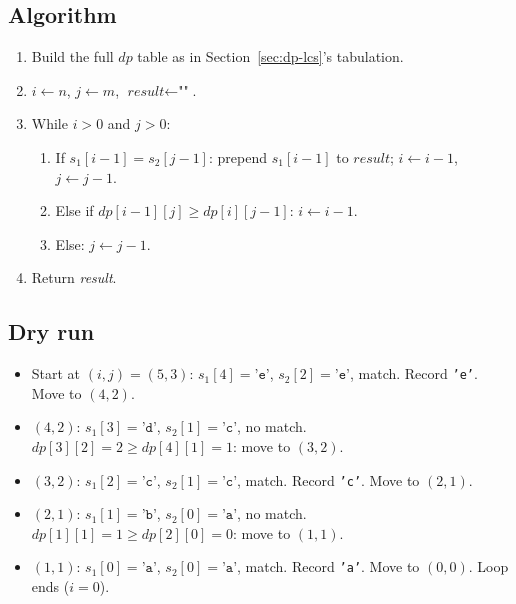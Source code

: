 \subsection*{Algorithm}

\begin{enumerate}
  \item Build the full $\textit{dp}$ table as in
        Section~\ref{sec:dp-lcs}'s tabulation.
  \item $i \gets n$, $j \gets m$, $\textit{result} \gets \texttt{""}$.
  \item While $i>0$ and $j>0$:
  \begin{enumerate}
    \item If $s_1[i-1] = s_2[j-1]$: prepend $s_1[i-1]$ to
          $\textit{result}$; $i \gets i-1$, $j \gets j-1$.
    \item Else if $\textit{dp}[i-1][j] \ge \textit{dp}[i][j-1]$:
          $i \gets i-1$.
    \item Else: $j \gets j-1$.
  \end{enumerate}
  \item Return \textit{result}.
\end{enumerate}

\subsection*{Dry run}


\begin{itemize}
  \item Start at $(i,j)=(5,3)$: $s_1[4]=\texttt{'e'}$,
        $s_2[2]=\texttt{'e'}$, match. Record \texttt{'e'}. Move to
        $(4,2)$.
  \item $(4,2)$: $s_1[3]=\texttt{'d'}$, $s_2[1]=\texttt{'c'}$, no
        match. $\textit{dp}[3][2]=2 \ge \textit{dp}[4][1]=1$: move to
        $(3,2)$.
  \item $(3,2)$: $s_1[2]=\texttt{'c'}$, $s_2[1]=\texttt{'c'}$, match.
        Record \texttt{'c'}. Move to $(2,1)$.
  \item $(2,1)$: $s_1[1]=\texttt{'b'}$, $s_2[0]=\texttt{'a'}$, no
        match. $\textit{dp}[1][1]=1 \ge \textit{dp}[2][0]=0$: move to
        $(1,1)$.
  \item $(1,1)$: $s_1[0]=\texttt{'a'}$, $s_2[0]=\texttt{'a'}$, match.
        Record \texttt{'a'}. Move to $(0,0)$. Loop ends ($i=0$).
\end{itemize}


